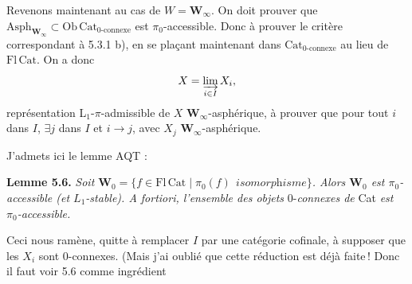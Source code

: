 \documentclass[11pt]{article}
\begin{document}
Revenons maintenant au cas de $W = \mathbf{W}_\infty$. On doit prouver que $\mathrm{Asph}_{\mathbf{W}_\infty} \subset \mathrm{Ob}\,\mathrm{Cat}_{\text{0-connexe}}$ est $\pi_0$-accessible. Donc à prouver le critère correspondant à 5.3.1 b), en se plaçant maintenant dans $\mathrm{Cat}_{\text{0-connexe}}$ au lieu de $\mathrm{Fl}\,\mathrm{Cat}$. On a donc
\[
X = \varinjlim_{i\in I} X_i,
\]
représentation L$_1$-$\pi$-admissible de $X$ $\mathbf{W}_\infty$-asphérique, à prouver que pour tout $i$ dans $I$, $\exists j$ dans $I$ et $i \longrightarrow j$, avec $X_j$ $\mathbf{W}_\infty$-asphérique.

J'admets ici le lemme AQT :

\textbf{Lemme 5.6.} \textit{Soit $\mathbf{W}_0 = \{f \in \mathrm{Fl}\,\mathrm{Cat} \mid \pi_0(f) \ \ \textit{isomorphisme}\}$. Alors $\mathbf{W}_0$ est $\pi_0$-accessible (et $L_1$-stable). A fortiori, l'ensemble des objets} 0-\textit{connexes de} Cat \textit{est $\pi_0$-accessible.}

Ceci nous ramène, quitte à remplacer $I$ par une catégorie cofinale, à supposer que les $X_i$ sont 0-connexes. (Mais j'ai oublié que cette réduction est déjà faite\,! Donc il faut voir 5.6 comme ingrédient
\end{document}
